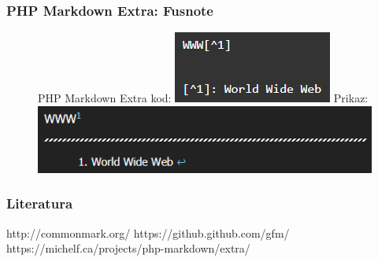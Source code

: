 \documentclass{beamer}
\begin{document}
\newpage


\begin{frame}
\frametitle{PHP Markdown Extra: Fusnote}
\begin{figure}
\centering
{PHP Markdown Extra kod:}
\newline
\newline
\centering
\includegraphics[width = 0.5\linewidth]{fusnote1.png}
\newline
\newline
\centering
{Prikaz:}
\newline
\newline
\centering
\includegraphics[width = 0.5\linewidth]{fusnote2.png}
\end{figure}
\end{frame}


\newpage
\begin{frame}
\frametitle{Literatura}

\begin{thebibliography}{9}
\beamertemplatetextbibitems
{}
http://commonmark.org/
\beamertemplatetextbibitems
{}
https://github.github.com/gfm/
\beamertemplatetextbibitems
{}
https://michelf.ca/projects/php-markdown/extra/
\end{thebibliography}
\end{frame}
\end{document}
